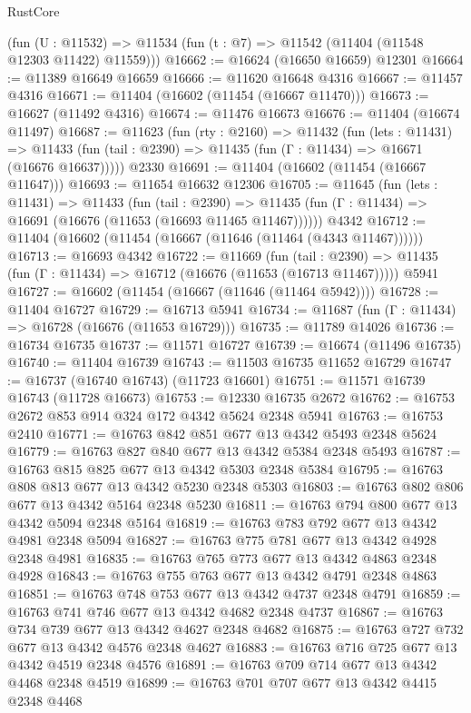 \begin{lexlean}{RustCore}
\begin{coremodule}
    (fun (U : @11532) => @11534 (fun (t : @7) => @11542 (@11404 (@11548 @12303 @11422) @11559)))
@16662 := @16624 (@16650 @16659) @12301
@16664 := @11389 @16649 @16659
@16666 := @11620 @16648 @4316
@16667 := @11457 @4316
@16671 := @11404 (@16602 (@11454 (@16667 @11470)))
@16673 := @16627 (@11492 @4316)
@16674 := @11476 @16673
@16676 := @11404 (@16674 @11497)
@16687 := @11623
    (fun (rty : @2160) =>
    @11432
      (fun (lets : @11431) =>
      @11433 (fun (tail : @2390) => @11435 (fun (Γ : @11434) => @16671 (@16676 @16637)))))
    @2330
@16691 := @11404 (@16602 (@11454 (@16667 @11647)))
@16693 := @11654 @16632 @12306
@16705 := @11645
    (fun (lets : @11431) =>
    @11433
      (fun (tail : @2390) =>
      @11435 (fun (Γ : @11434) => @16691 (@16676 (@11653 (@16693 @11465 @11467))))))
    @4342
@16712 := @11404 (@16602 (@11454 (@16667 (@11646 (@11464 (@4343 @11467))))))
@16713 := @16693 @4342
@16722 := @11669
    (fun (tail : @2390) => @11435 (fun (Γ : @11434) => @16712 (@16676 (@11653 (@16713 @11467)))))
    @5941
@16727 := @16602 (@11454 (@16667 (@11646 (@11464 @5942))))
@16728 := @11404 @16727
@16729 := @16713 @5941
@16734 := @11687 (fun (Γ : @11434) => @16728 (@16676 (@11653 @16729)))
@16735 := @11789 @14026
@16736 := @16734 @16735
@16737 := @11571 @16727
@16739 := @16674 (@11496 @16735)
@16740 := @11404 @16739
@16743 := @11503 @16735 @11652 @16729
@16747 := @16737 (@16740 @16743) (@11723 @16601)
@16751 := @11571 @16739 @16743 (@11728 @16673)
@16753 := @12330 @16735 @2672
@16762 := @16753 @2672 @853 @914 @324 @172 @4342 @5624 @2348 @5941
@16763 := @16753 @2410
@16771 := @16763 @842 @851 @677 @13 @4342 @5493 @2348 @5624
@16779 := @16763 @827 @840 @677 @13 @4342 @5384 @2348 @5493
@16787 := @16763 @815 @825 @677 @13 @4342 @5303 @2348 @5384
@16795 := @16763 @808 @813 @677 @13 @4342 @5230 @2348 @5303
@16803 := @16763 @802 @806 @677 @13 @4342 @5164 @2348 @5230
@16811 := @16763 @794 @800 @677 @13 @4342 @5094 @2348 @5164
@16819 := @16763 @783 @792 @677 @13 @4342 @4981 @2348 @5094
@16827 := @16763 @775 @781 @677 @13 @4342 @4928 @2348 @4981
@16835 := @16763 @765 @773 @677 @13 @4342 @4863 @2348 @4928
@16843 := @16763 @755 @763 @677 @13 @4342 @4791 @2348 @4863
@16851 := @16763 @748 @753 @677 @13 @4342 @4737 @2348 @4791
@16859 := @16763 @741 @746 @677 @13 @4342 @4682 @2348 @4737
@16867 := @16763 @734 @739 @677 @13 @4342 @4627 @2348 @4682
@16875 := @16763 @727 @732 @677 @13 @4342 @4576 @2348 @4627
@16883 := @16763 @716 @725 @677 @13 @4342 @4519 @2348 @4576
@16891 := @16763 @709 @714 @677 @13 @4342 @4468 @2348 @4519
@16899 := @16763 @701 @707 @677 @13 @4342 @4415 @2348 @4468

\end{coremodule}
\end{lexlean}
